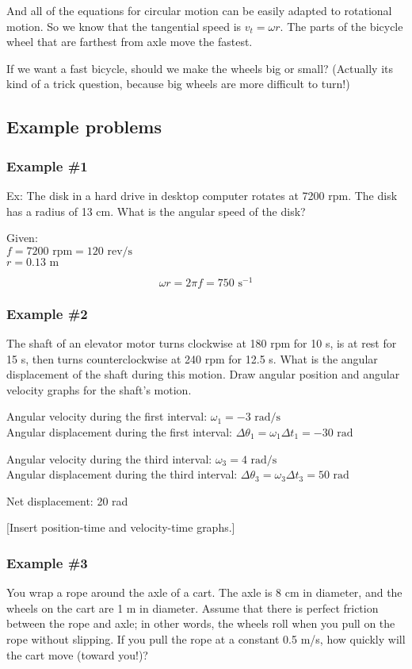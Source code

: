 And all of the equations for circular motion can be easily adapted to rotational motion. So we know that the tangential speed is $v_t=\omega{r}$. The parts of the bicycle wheel that are farthest from axle move the fastest. 

If we want a fast bicycle, should we make the wheels big or small? (Actually its kind of a trick question, because big wheels are more difficult to turn!)

\subsection{Example problems}
\subsubsection{Example \#1}
Ex: The disk in a hard drive in desktop computer rotates at 7200 rpm. The disk has a radius of 13 cm. What is the angular speed of the disk?

Given:\\
$f=7200\mbox{ rpm}=120\mbox{ rev/s}$\\
$r=0.13\mbox{ m}$

$$\omega{r}=2\pi f=750\mbox{ s}^{-1}$$

\subsubsection{Example \#2}
The shaft of an elevator motor turns clockwise at 180 rpm for 10 s, is at rest for 15 s, then turns counterclockwise at 240 rpm for 12.5 s. What is the angular displacement of the shaft during this motion. Draw angular position and angular velocity graphs for the shaft's motion.

Angular velocity during the first interval: $\omega_1=-3\mbox{ rad/s}$\\
Angular displacement during the first interval: $\Delta\theta_1=\omega_1\Delta{t_1}=-30\mbox{ rad}$

Angular velocity during the third interval: $\omega_3=4\mbox{ rad/s}$\\
Angular displacement during the third interval: $\Delta\theta_3=\omega_3\Delta{t_3}=50\mbox{ rad}$

Net displacement: 20 rad

[Insert position-time and velocity-time graphs.]

\clearpage
\subsubsection{Example \#3}
You wrap a rope around the axle of a cart. The axle is 8 cm in diameter, and the wheels on the cart are 1 m in diameter. Assume that there is perfect friction between the rope and axle; in other words, the wheels roll when you pull on the rope without slipping. If you pull the rope at a constant 0.5 m/s, how quickly will the cart move (toward you!)? 

